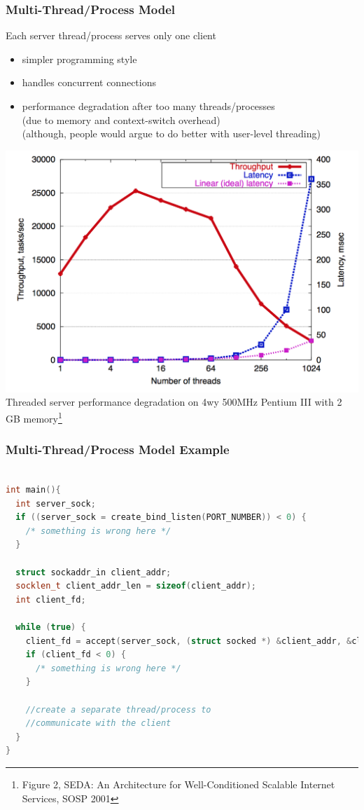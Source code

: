 \documentclass[aspectratio=43]{beamer}
\begin{document}
\begin{frame}[fragile]
  \frametitle{Multi-Thread/Process Model}
  Each server thread/process serves only one client\\
  \begin{itemize}
  \item simpler programming style
  \item handles concurrent connections
  \item performance degradation after too many threads/processes\\
  {\scriptsize (due to memory and context-switch overhead)}\\
  {\scriptsize (although, people would argue to do better with user-level threading)}
  \end{itemize}
  
  \begin{center}
   \includegraphics[scale=0.3]{server_mp_degrade.png}\\
   {\tiny Threaded server performance degradation on 4wy 500MHz Pentium III with 2 GB memory\footnote{\tiny Figure 2, SEDA: An Architecture for Well-Conditioned Scalable Internet Services, SOSP 2001}}
  \end{center}
\end{frame}
\begin{frame}[fragile]
  \frametitle{Multi-Thread/Process Model Example}
  \begin{lstlisting}[language=C++,basicstyle=\ttfamily\footnotesize,commentstyle=\color{commgreen},keywordstyle=\color{blue},breaklines=true]

int main(){
  int server_sock;
  if ((server_sock = create_bind_listen(PORT_NUMBER)) < 0) {
    /* something is wrong here */
  }
    
  struct sockaddr_in client_addr;
  socklen_t client_addr_len = sizeof(client_addr);
  int client_fd;
    
  while (true) {
    client_fd = accept(server_sock, (struct socked *) &client_addr, &client_addr_len);
    if (client_fd < 0) {
      /* something is wrong here */
    }
        
    //create a separate thread/process to
    //communicate with the client
  }
}
\end{lstlisting}
\end{frame}
\end{document}
